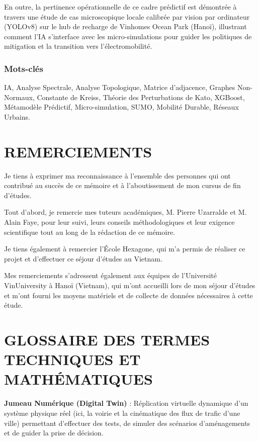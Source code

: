 \documentclass[10pt, a4paper]{article}
\begin{document}
En outre, la pertinence opérationnelle de ce cadre prédictif est
démontrée à travers une étude de cas microscopique locale calibrée par
vision par ordinateur (YOLOv8) sur le hub de recharge de Vinhomes Ocean
Park (Hanoï), illustrant comment l'IA s'interface avec les
micro-simulations pour guider les politiques de mitigation et la
transition vers l'électromobilité.

\subsubsection{Mots-clés}\label{mots-cluxe9s}

IA, Analyse Spectrale, Analyse Topologique, Matrice d'adjacence, Graphes
Non-Normaux, Constante de Kreiss, Théorie des Perturbations de Kato,
XGBoost, Métamodèle Prédictif, Micro-simulation, SUMO, Mobilité Durable,
Réseaux Urbains.

\newpage

\section{REMERCIEMENTS}\label{remerciements}

Je tiens à exprimer ma reconnaissance à l'ensemble des personnes qui ont
contribué au succès de ce mémoire et à l'aboutissement de mon cursus de
fin d'études.

Tout d'abord, je remercie mes tuteurs académiques, M. Pierre Uzarralde
et M. Alain Faye, pour leur suivi, leurs conseils méthodologiques et
leur exigence scientifique tout au long de la rédaction de ce mémoire.

Je tiens également à remercier l'École Hexagone, qui m'a permis de
réaliser ce projet et d'effectuer ce séjour d'études au Vietnam.

Mes remerciements s'adressent également aux équipes de l'Université
VinUniversity à Hanoï (Vietnam), qui m'ont accueilli lors de mon séjour
d'études et m'ont fourni les moyens matériels et de collecte de données
nécessaires à cette étude.

\newpage

\section{GLOSSAIRE DES TERMES TECHNIQUES ET
MATHÉMATIQUES}\label{glossaire-des-termes-techniques-et-mathuxe9matiques}

\begingroup
\setlength{\parskip}{0.8em}

\textbf{Jumeau Numérique (Digital Twin)} : Réplication virtuelle
dynamique d'un système physique réel (ici, la voirie et la cinématique
des flux de trafic d'une ville) permettant d'effectuer des tests, de
simuler des scénarios d'aménagements et de guider la prise de décision.
\end{document}
